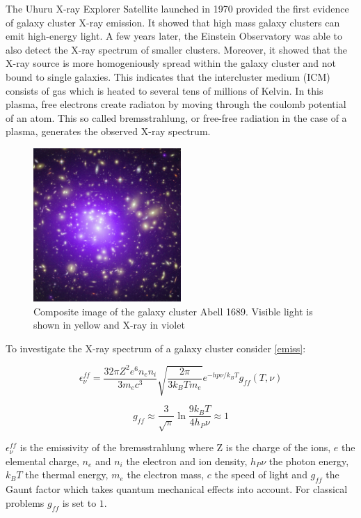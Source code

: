 The Uhuru X-ray Explorer Satellite launched in 1970 provided the first evidence of galaxy cluster X-ray emission. It showed that high mass galaxy clusters can emit high-energy light. A few years later, the Einstein Observatory was able to also detect the X-ray spectrum of smaller clusters. Moreover, it showed that the X-ray source is more homogeniously spread within the galaxy cluster and not bound to single galaxies. This indicates that the intercluster medium (ICM) consists of gas which is heated to several tens of millions of Kelvin. In this plasma, free electrons create radiaton by moving through the coulomb potential of an atom. This so called bremsstrahlung, or free-free radiation in the case of a plasma, generates the observed X-ray spectrum. 

\begin{figure}[h]
 \centering
 \includegraphics[width=0.5\textwidth]{images/Chapter2/a1689.jpg}
 \caption{Composite image of the galaxy cluster Abell 1689. Visible light is shown in yellow and X-ray in violet \citep{hubble-2010}}
 \label{fig:Abell1689}
\end{figure}

To investigate the X-ray spectrum of a galaxy cluster consider \eqref{emiss}:

\begin{equation}
\label{emiss}
    \epsilon^{ff}_{\nu} = \frac{32\pi Z^2 e^6 n_e n_i}{3m_ec^3}\sqrt{\frac{2\pi}{3k_B T m_e}}e^{-hp\nu/k_B T}g_{ff}(T,\nu)
\end{equation}

\begin{equation}
\label{emiss_g}
g_{ff} \approx \frac{3}{\sqrt{\pi}}\ln{\frac{9k_B T}{4h_P \nu}} \approx 1
\end{equation}

$\epsilon^{ff}_{\nu}$ is the emissivity of the bremsstrahlung where Z is the charge of the ions, $e$ the elemental charge, $n_e$ and $n_i$ the electron and ion density, $h_P \nu$ the photon energy, $k_BT$ the thermal energy, $m_e$ the electron mass, $c$ the speed of light and $g_{ff}$ the Gaunt factor which takes quantum mechanical effects into account. For classical problems $g_{ff}$ is set to $1$.

